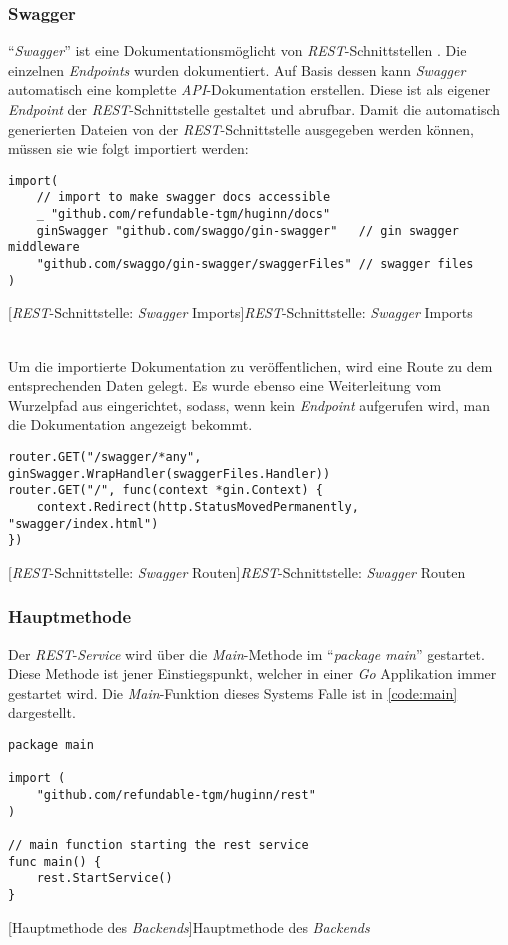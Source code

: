 \subsubsection{Swagger}

\enquote{\textit{Swagger}} ist eine Dokumentationsmöglicht von \textit{REST}-Schnittstellen \cite{swaggo}. Die einzelnen \textit{Endpoints} wurden dokumentiert. Auf Basis dessen kann \textit{Swagger} automatisch eine  komplette \textit{API}-Dokumentation erstellen. Diese ist als eigener \textit{Endpoint} der \textit{REST}-Schnittstelle gestaltet und abrufbar. Damit die automatisch generierten Dateien von der \textit{REST}-Schnittstelle ausgegeben werden können, müssen sie wie folgt importiert werden:

\begin{verbatim}
import(
	// import to make swagger docs accessible
	_ "github.com/refundable-tgm/huginn/docs"
	ginSwagger "github.com/swaggo/gin-swagger"   // gin swagger middleware
	"github.com/swaggo/gin-swagger/swaggerFiles" // swagger files
)
\end{verbatim}
[\textit{REST}-Schnittstelle: \textit{Swagger} Imports]{\textit{REST}-Schnittstelle: \textit{Swagger} Imports \cite{swagtut}}

~\\ Um die importierte Dokumentation zu veröffentlichen, wird eine Route zu dem entsprechenden Daten gelegt. Es wurde ebenso eine Weiterleitung vom Wurzelpfad aus eingerichtet, sodass, wenn kein \textit{Endpoint} aufgerufen wird, man die Dokumentation angezeigt bekommt.

\begin{verbatim}
router.GET("/swagger/*any", ginSwagger.WrapHandler(swaggerFiles.Handler))
router.GET("/", func(context *gin.Context) {
	context.Redirect(http.StatusMovedPermanently, "swagger/index.html")
})
\end{verbatim}
[\textit{REST}-Schnittstelle: \textit{Swagger} Routen]{\textit{REST}-Schnittstelle: \textit{Swagger} Routen}

\subsubsection{Hauptmethode}

Der \textit{REST}-\textit{Service} wird über die \textit{Main}-Methode im \enquote{\textit{package main}} gestartet. Diese Methode ist jener Einstiegspunkt, welcher in einer \textit{Go} Applikation immer gestartet wird. Die \textit{Main}-Funktion dieses Systems Falle ist in \autoref{code:main} dargestellt.

\begin{verbatim}
package main

import (
	"github.com/refundable-tgm/huginn/rest"
)

// main function starting the rest service
func main() {
	rest.StartService()
}
\end{verbatim}
[Hauptmethode des \textit{Backends}]{Hauptmethode des \textit{Backends}}
\label{code:main}
